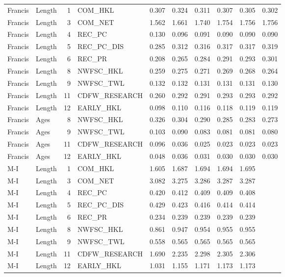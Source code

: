 \documentclass[11pt,
  english,
  a4paper,
]{article}
\begin{document}
\begin{landscape}
\begin{longtable}[t]{llrlrrrrrr}
\endfoot
\bottomrule
\endlastfoot
Francis & Length & 1 & COM\_HKL & 0.307 & 0.324 & 0.311 & 0.307 & 0.305 & 0.302\\
Francis & Length & 3 & COM\_NET & 1.562 & 1.661 & 1.740 & 1.754 & 1.756 & 1.756\\
Francis & Length & 4 & REC\_PC & 0.130 & 0.096 & 0.091 & 0.090 & 0.090 & 0.090\\
Francis & Length & 5 & REC\_PC\_DIS & 0.285 & 0.312 & 0.316 & 0.317 & 0.317 & 0.319\\
Francis & Length & 6 & REC\_PR & 0.208 & 0.265 & 0.284 & 0.291 & 0.293 & 0.301\\
Francis & Length & 8 & NWFSC\_HKL & 0.259 & 0.275 & 0.271 & 0.269 & 0.268 & 0.264\\
Francis & Length & 9 & NWFSC\_TWL & 0.132 & 0.132 & 0.131 & 0.131 & 0.131 & 0.130\\
Francis & Length & 11 & CDFW\_RESEARCH & 0.260 & 0.292 & 0.291 & 0.293 & 0.293 & 0.292\\
Francis & Length & 12 & EARLY\_HKL & 0.098 & 0.110 & 0.116 & 0.118 & 0.119 & 0.119\\
Francis & Ages & 8 & NWFSC\_HKL & 0.326 & 0.304 & 0.290 & 0.285 & 0.283 & 0.273\\
Francis & Ages & 9 & NWFSC\_TWL & 0.103 & 0.090 & 0.083 & 0.081 & 0.081 & 0.080\\
Francis & Ages & 11 & CDFW\_RESEARCH & 0.096 & 0.036 & 0.025 & 0.023 & 0.023 & 0.023\\
Francis & Ages & 12 & EARLY\_HKL & 0.048 & 0.036 & 0.031 & 0.030 & 0.030 & 0.030\\
M-I & Length & 1 & COM\_HKL & 1.605 & 1.687 & 1.694 & 1.694 & 1.695 & \\
M-I & Length & 3 & COM\_NET & 3.082 & 3.275 & 3.286 & 3.287 & 3.287 & \\
M-I & Length & 4 & REC\_PC & 0.420 & 0.412 & 0.409 & 0.409 & 0.408 & \\
M-I & Length & 5 & REC\_PC\_DIS & 0.429 & 0.423 & 0.416 & 0.414 & 0.414 & \\
M-I & Length & 6 & REC\_PR & 0.234 & 0.239 & 0.239 & 0.239 & 0.239 & \\
M-I & Length & 8 & NWFSC\_HKL & 0.861 & 0.947 & 0.954 & 0.955 & 0.955 & \\
M-I & Length & 9 & NWFSC\_TWL & 0.558 & 0.565 & 0.565 & 0.565 & 0.565 & \\
M-I & Length & 11 & CDFW\_RESEARCH & 1.690 & 2.235 & 2.298 & 2.305 & 2.306 & \\
M-I & Length & 12 & EARLY\_HKL & 1.031 & 1.155 & 1.171 & 1.173 & 1.173 & \\

\end{longtable}
\end{landscape}
\end{document}
